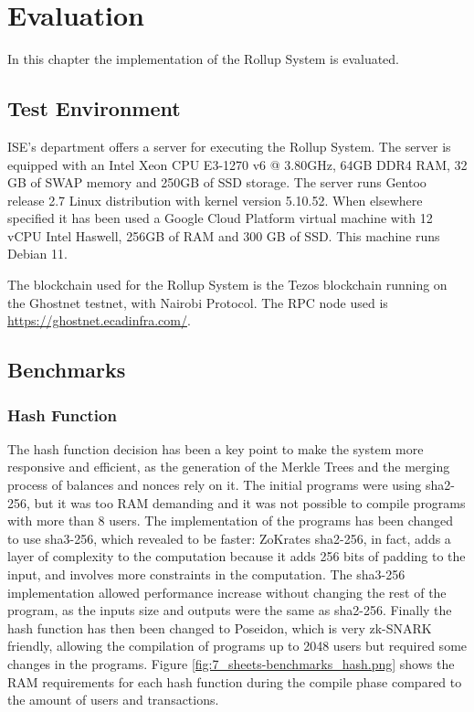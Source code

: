 \chapter{Evaluation\label{cha:chapter7}}

In this chapter the implementation of the Rollup System is evaluated.



\section{Test Environment\label{sec:testenvir}}

ISE's department offers a server for executing the Rollup System. The server is equipped with an Intel Xeon CPU E3-1270 v6 @ 3.80GHz, 64GB DDR4 RAM, 32 GB of SWAP memory and 250GB of SSD storage. The server runs Gentoo release 2.7 Linux distribution with kernel version 5.10.52. When elsewhere specified it has been used a Google Cloud Platform virtual machine with 12 vCPU Intel Haswell, 256GB of RAM and 300 GB of SSD. This machine runs Debian 11.

The blockchain used for the Rollup System is the Tezos blockchain running on the Ghostnet testnet, with Nairobi Protocol. The RPC node used is \url{https://ghostnet.ecadinfra.com/}.


\section{Benchmarks\label{sec:benchmarks}}

\subsection{Hash Function\label{subsec:6_hashfunc}}

The hash function decision has been a key point to make the system more responsive and efficient, as the generation of the Merkle Trees and the merging process of balances and nonces rely on it. The initial programs were using sha2-256, but it was too RAM demanding and it was not possible to compile programs with more than 8 users. The implementation of the programs has been changed to use sha3-256, which revealed to be faster: ZoKrates sha2-256, in fact, adds a layer of complexity to the computation because it adds 256 bits of padding to the input, and involves more constraints in the computation. The sha3-256 implementation allowed performance increase without changing the rest of the program, as the inputs size and outputs were the same as sha2-256.
Finally the hash function has then been changed to Poseidon, which is very zk-SNARK friendly, allowing the compilation of programs up to 2048 users but required some changes in the programs. Figure \ref{fig:7_sheets-benchmarks_hash.png} shows the RAM requirements for each hash function during the compile phase compared to the amount of users and transactions.

